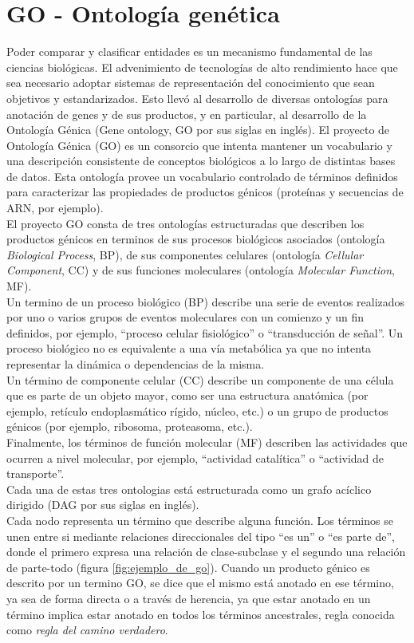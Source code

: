 \section{GO - Ontología genética}
\label{sec:go}
Poder comparar y clasificar entidades es un mecanismo fundamental de las ciencias biológicas. El advenimiento de tecnologías de alto rendimiento hace que sea necesario adoptar sistemas de representación del conocimiento que sean objetivos y estandarizados. Esto llevó al desarrollo de diversas ontologías para anotación de genes y de sus productos, y en particular, al desarrollo de la Ontología Génica (Gene ontology, GO por sus siglas en inglés).
El proyecto de Ontología Génica (GO) es un consorcio que intenta mantener un vocabulario y una descripción consistente de conceptos biológicos a lo largo de distintas bases de datos. Esta ontología provee un vocabulario controlado de términos definidos para caracterizar las propiedades de productos génicos (proteínas y secuencias de ARN, por ejemplo).\\
El proyecto GO consta de tres ontologías estructuradas que describen los productos génicos en terminos de sus procesos biológicos asociados (ontología \textit{Biological Process}, BP), de sus componentes celulares (ontología \textit{Cellular Component}, CC) y de sus funciones moleculares (ontología \textit{Molecular Function}, MF).\\
Un termino de un proceso biológico (BP) describe una serie de eventos realizados por uno o varios grupos de eventos moleculares con un comienzo y un fin definidos, por ejemplo, ``proceso celular fisiológico'' o ``transducción de señal''. Un proceso biológico no es equivalente a una vía metabólica ya que no intenta representar la dinámica o dependencias de la misma.\\
Un término de componente celular (CC) describe un componente de una célula que es parte de un objeto mayor, como ser una estructura anatómica (por ejemplo, retículo endoplasmático rígido, núcleo, etc.) o un grupo de productos génicos (por ejemplo, ribosoma, proteasoma, etc.).\\
Finalmente, los términos de función molecular (MF) describen las actividades que ocurren a nivel molecular, por ejemplo, ``actividad catalítica'' o ``actividad de transporte''.\\
Cada una de estas tres ontologias está estructurada como un grafo acíclico dirigido (DAG por sus siglas en inglés).\\
Cada nodo representa un término que describe alguna función. Los términos se unen entre si mediante relaciones direccionales del tipo ``es un'' o ``es parte de'', donde el primero expresa una relación de clase-subclase y el segundo una relación de parte-todo (figura \ref{fig:ejemplo_de_go}). Cuando un producto génico es descrito por un termino GO, se dice que el mismo está anotado en ese término, ya sea de forma directa o a través de herencia, ya que estar anotado en un término implica estar anotado en todos los términos ancestrales, regla conocida como \textit{regla del camino verdadero}.\\
